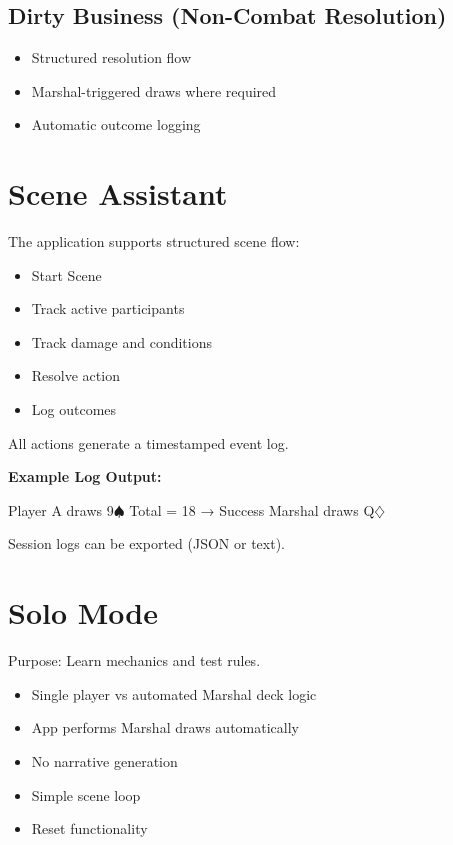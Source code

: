 \documentclass[11pt,a4paper]{article}
\begin{document}
\subsection{Dirty Business (Non-Combat Resolution)}

\begin{itemize}[leftmargin=2em]
    \item Structured resolution flow
    \item Marshal-triggered draws where required
    \item Automatic outcome logging
\end{itemize}

\section{Scene Assistant}

The application supports structured scene flow:

\begin{itemize}[leftmargin=2em]
    \item Start Scene
    \item Track active participants
    \item Track damage and conditions
    \item Resolve action
    \item Log outcomes
\end{itemize}

All actions generate a timestamped event log.

\textbf{Example Log Output:}

{\ttfamily
[Turn 3] Player A draws 9$\spadesuit$ \newline
[Turn 3] Total = 18 → Success \newline
[Turn 3] Marshal draws Q$\diamondsuit$
}

Session logs can be exported (JSON or text).

\section{Solo Mode}

Purpose: Learn mechanics and test rules.

\begin{itemize}[leftmargin=2em]
    \item Single player vs automated Marshal deck logic
    \item App performs Marshal draws automatically
    \item No narrative generation
    \item Simple scene loop
    \item Reset functionality
\end{itemize}
\end{document}
